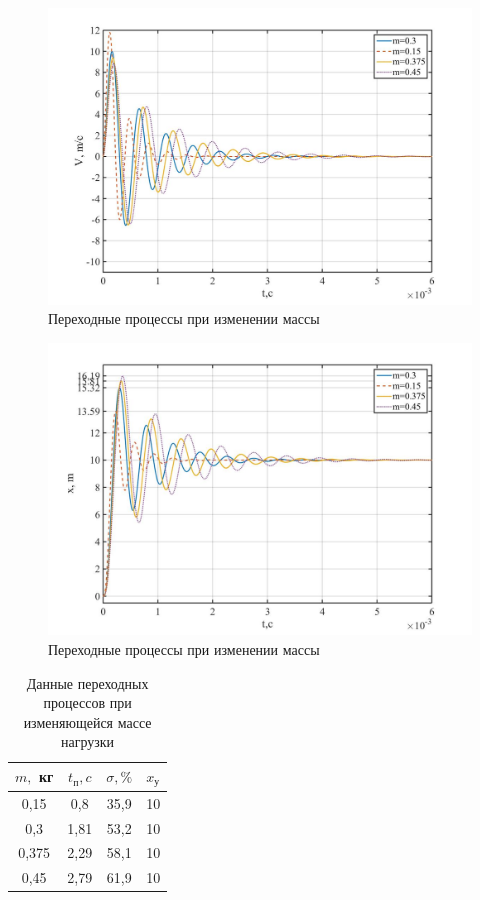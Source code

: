 \documentclass[a4paper, 12pt]{article}
\begin{document}
\begin{figure}[h!]
	\centering
	\includegraphics[width = 0.6\textheight]{data/V_m}
	\caption{Переходные процессы при изменении массы}
	\label{V_m}
\end{figure}

\newpage

\begin{figure}[h!]
	\centering
	\includegraphics[width = 0.6\textheight]{data/x_m}
	\caption{Переходные процессы при изменении массы}
	\label{x_m}
\end{figure}


\begin{table}[ht!]
	\centering
	\begin{threeparttable}
		\caption{Данные переходных процессов при изменяющейся массе нагрузки}
		\begin{tabular}{|c|c|c|c|}
			\hline
			$m,$ кг	& $t_\text{п}, c$	& $\sigma, \%$	& $x_\text{у}$\\\hline
			0,15	& 0,8				& 35,9			& 10\\
			\hline
			0,3		& 1,81				& 53,2			& 10\\
			\hline
			0,375	& 2,29				& 58,1			& 10\\
			\hline
			0,45	& 2,79				& 61,9			& 10\\
			\hline
		\end{tabular}
		\label{tab:x_m}
	\end{threeparttable}
\end{table}
\end{document}

